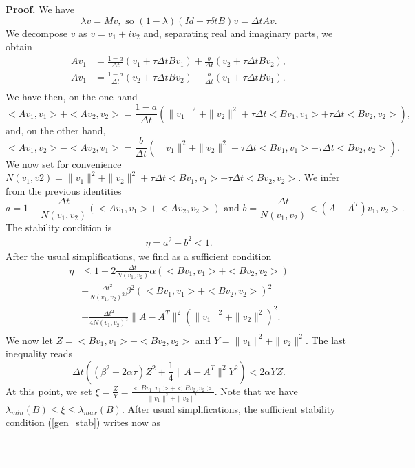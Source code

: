 \documentclass[11pt]{article}
\newenvironment{proof}[1][Proof]{\textbf{#1.} }{\ \rule{0.5em}{0.5em}}
\newcommand{\Frac}[2] {\frac{\textstyle #1} {\textstyle #2}}
\begin{document}
{\begin{proof}
We have
$$
\lambda v=Mv,
\mbox{ so } 
(1-\lambda)\left(Id + \tau \delta t B\right)v=\Delta t  Av .
$$
We decompose $v$ as $v=v_1+iv_2$ and, separating real and imaginary parts, we obtain
$$
\begin{array}{ll}
Av_1&=\Frac{1-a}{\Delta t}\left( v_1+\tau \Delta t Bv_1\right) +
\Frac{b}{\Delta t}\left( v_2+\tau \Delta t Bv_2\right),\\
Av_1&=\Frac{1-a}{\Delta t}\left( v_2+\tau \Delta t Bv_2\right) -
\Frac{b}{\Delta t}\left( v_1+\tau \Delta t Bv_1\right).\\
\end{array}
$$
We have then, on the one hand
$$
<Av_1,v_1>+<Av_2,v_2>=\Frac{1-a}{\Delta t}\left(  \parallel v_1\parallel^2+\parallel v_2\parallel^2+\tau \Delta t <Bv_1,v_1>+\tau \Delta t <Bv_2,v_2>\right),
$$
and, on the other hand,
$$
<Av_1,v_2>-<Av_2,v_1>=
\Frac{b}{\Delta t}\left( \parallel v_1\parallel^2+\parallel v_2\parallel^2+\tau \Delta t <Bv_1,v_1>+\tau \Delta t <Bv_2,v_2>\right).
$$
We now set for convenience $N(v_1,v2)=\parallel v_1\parallel^2+\parallel v_2\parallel^2+\tau \Delta t <Bv_1,v_1>+\tau \Delta t <Bv_2,v_2>$. 
We infer from the previous identities
$$
a=1-\Frac{\Delta t }{N(v_1,v_2)} \left( <Av_1,v_1>+<Av_2,v_2> \right)
\mbox{ and }
b=\Frac{\Delta t }{N(v_1,v_2)}<(A-A^T)v_1,v_2>.
$$
The stability condition is
\begin{eqnarray}
\label{gen_stab}
\eta=a^2+b^2<1.
\end{eqnarray}
After the usual simplifications, we find  as a sufficient condition
$$
\begin{array}{ll}
\eta &\le 1-2\Frac{\Delta t}{N(v_1,v_2)}\alpha \left( <Bv_1,v_1>+<Bv_2,v_2>\right)\\
&+\Frac{\Delta t^2}{N(v_1,v_2)^2}\beta^2  \left( <Bv_1,v_1>+<Bv_2,v_2>\right)^2\\
&+\Frac{\Delta t^2}{4N(v_1,v_2)^2}\parallel A-A^T\parallel^2\left( \parallel v_1\parallel^2+ \parallel v_2\parallel^2\right)^2. \\
\end{array}
$$
We now let $Z=<Bv_1,v_1>+<Bv_2,v_2>$ and $Y=\parallel v_1\parallel^2+ \parallel v_2\parallel^2$. The last inequality reads
$$
\Delta t \left( (\beta^2-2\alpha \tau)Z^2 +\Frac{1}{4}\parallel A-A^T\parallel^2 Y^2\right) < 2\alpha YZ .
$$
At this point, we set $\xi=\Frac{Z}{Y}=\Frac{<Bv_1,v_1>+<Bv_2,v_2>}{\parallel v_1\parallel^2+ \parallel v_2\parallel^2}$. Note that we have $\lambda_{min}(B)\le \xi \le \lambda_{max}(B)$.
After usual simplifications, the sufficient stability condition (\ref{gen_stab}) writes now as

\end{proof}}
\end{document}
